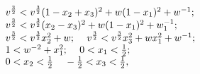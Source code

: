 \begin{equation}
\qquad \qquad
\begin{tabular}{l}
$v^{\frac{3}{2}} < v^{\frac{3}{2}} (1-x_2 + x_3)^2 + w(1-x_1)^2 +w^{-1};$   \\
$v^{\frac{3}{2}} < v^{\frac{3}{2}}(x_2-x_3)^2 + w(1-x_1)^2 + w^{-1}_1;$ \\
$v^{\frac{3}{2}} < v^{\frac{3}{2}} x^2_2 + w; 
\,\,\,\,\,\,\,
v^{\frac{3}{2}} < v^{\frac{3}{2}} x^2_3 + wx^2_1 + w^{-1};$ \\
$1 < w^{-2} + x^2_1; \,\,\,\,\,\,\,
0 < x_1 < \frac{1}{2} $;\\ %
$ 0 < x_2 < \frac{1}{2} \,\,\,\,\,\,\,
-\frac{1}{2} < x_3 < \frac{1}{2},$ %
\end{tabular} 
\end{equation}

